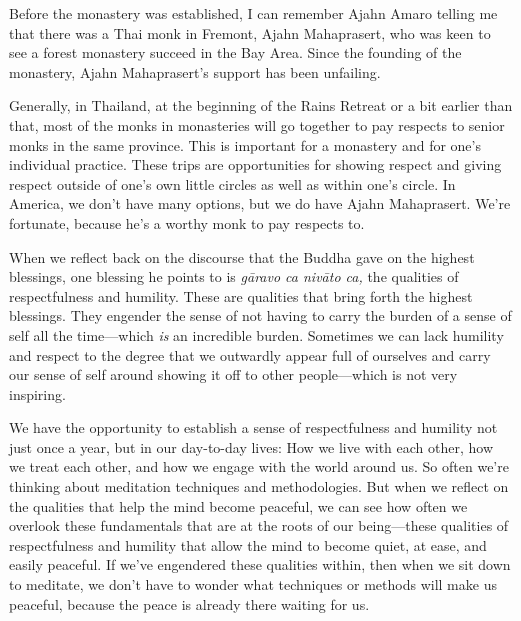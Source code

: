 
Before the monastery was established, I can remember Ajahn Amaro 
telling me that there was a Thai monk in Fremont, Ajahn Mahaprasert, 
who was keen to see a forest monastery succeed in the Bay Area. Since 
the founding of the monastery, Ajahn Mahaprasert's support has been 
unfailing.

Generally, in Thailand, at the beginning of the Rains Retreat or a bit 
earlier than that, most of the monks in monasteries will go together to 
pay respects to senior monks in the same province. This is important 
for a monastery and for one's individual practice. These trips are 
opportunities for showing respect and giving respect outside of one's 
own little circles as well as within one's circle. In America, we don't 
have many options, but we do have Ajahn Mahaprasert. We're fortunate, 
because he's a worthy monk to pay respects to.

When we reflect back on the discourse that the Buddha gave on the 
highest blessings, one blessing he points to is \emph{gāravo ca 
nivāto ca,} the qualities of respectfulness and humility. These are 
qualities that bring forth the highest blessings. They engender the 
sense of not having to carry the burden of a sense of self all the 
time---which \emph{is} an incredible burden. Sometimes we can lack 
humility and respect to the degree that we outwardly appear full of 
ourselves and carry our sense of self around showing it off to other 
people---which is not very inspiring.

We have the opportunity to establish a sense of respectfulness and 
humility not just once a year, but in our day-to-day lives: How we live 
with each other, how we treat each other, and how we engage with the 
world around us. So often we're thinking about meditation techniques 
and methodologies. But when we reflect on the qualities that help the 
mind become peaceful, we can see how often we overlook these 
fundamentals that are at the roots of our being---these qualities of 
respectfulness and humility that allow the mind to become quiet, at 
ease, and easily peaceful. If we've engendered these qualities within, 
then when we sit down to meditate, we don't have to wonder what 
techniques or methods will make us peaceful, because the peace is 
already there waiting for us.

